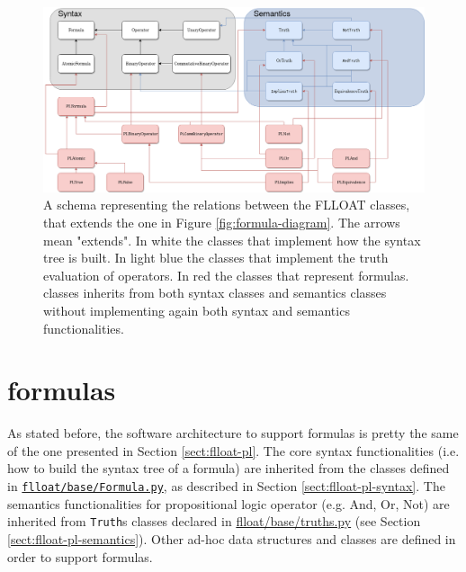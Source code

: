 \begin{figure}
	\centering
	\includegraphics[width=\textwidth]{images/pl-formula-diagram-truth}
	\caption{A schema representing the relations between the FLLOAT classes, that extends the one in Figure \ref{fig:formula-diagram}. The arrows mean "extends". In white the classes that implement how the syntax tree is built. In light blue the classes that implement the truth evaluation of operators. In red the classes that represent \PL formulas. \PL classes inherits from both syntax classes and semantics classes without implementing again both syntax and semantics functionalities.}
	\label{fig:formula-diagram-pl-truths}
\end{figure}
\clearpage

%


\section{\LTLf formulas}\label{sect:flloat-ltlf}
As stated before, the software architecture to support \LLf formulas is pretty the same of the one presented in Section \ref{sect:flloat-pl}. The core syntax functionalities (i.e. how to build the syntax tree of a \LLf formula) are inherited from the classes defined in \href{https://github.com/MarcoFavorito/flloat/blob/0.1.4/flloat/base/Formula.py}{\texttt{flloat/base/Formula.py}}, as described in Section \ref{sect:flloat-pl-syntax}. The semantics functionalities for propositional logic operator (e.g. And, Or, Not) are inherited from \texttt{Truth}s classes declared in \href{https://github.com/MarcoFavorito/flloat/blob/0.1.4/flloat/base/truths.py}{flloat/base/truths.py} (see Section \ref{sect:flloat-pl-semantics}). Other ad-hoc data structures and classes are defined in order to support \LLf formulas.

